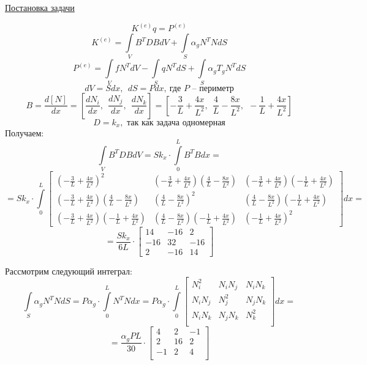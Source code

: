 \documentclass{bmstu}
\begin{document}
\begin{center}
\underline{Постановка задачи}
\end{center}
\[K^{(e)} q = P^{(e)}\]
\[K^{(e)} = \int \limits_V B^T D B dV + \int \limits_S \alpha_g N^T N dS\]
\[P^{(e)} = \int \limits_V f N^T dV - \int \limits_S q N^T dS + \int \limits_S \alpha_g T_g N^T dS\]
\[dV = Sdx,\ \ dS = Pdx,\ \text{где } P \text{ -- периметр}\]
\[B = \frac{d[N]}{dx} = \left[ \frac{dN_i}{dx},\ \  \frac{dN_j}{dx},\ \  \frac{dN_k}{dx}\right] = \left[ -\frac{3}{L} + \frac{4x}{L^2},\ \  \frac{4}{L} - \frac{8x}{L^2},\ \  -\frac{1}{L} + \frac{4x}{L^2}\right]\]
\[D = k_x, \text{ так как задача одномерная}\]
Получаем:
\[\int \limits_V B^T D B dV = S k_x \cdot \int \limits_0^L  B^T B dx =\]
\[= Sk_x \cdot \int \limits_0^L
\begin{bmatrix}
\left(-\frac{3}{L} + \frac{4x}{L^2} \right)^2 & \left(-\frac{3}{L} + \frac{4x}{L^2} \right)\left(\frac{4}{L} - \frac{8x}{L^2} \right) & \left(-\frac{3}{L} + \frac{4x}{L^2} \right)\left(-\frac{1}{L} + \frac{4x}{L^2} \right) \\
\left(-\frac{3}{L} + \frac{4x}{L^2} \right)\left(\frac{4}{L} - \frac{8x}{L^2} \right) & \left(\frac{4}{L} - \frac{8x}{L^2} \right)^2 & \left(\frac{4}{L} - \frac{8x}{L^2} \right)\left(-\frac{1}{L} + \frac{4x}{L^2} \right)\\
\left(-\frac{3}{L} + \frac{4x}{L^2} \right)\left(-\frac{1}{L} + \frac{4x}{L^2} \right)& \left(\frac{4}{L} - \frac{8x}{L^2} \right)\left(-\frac{1}{L} + \frac{4x}{L^2} \right) & \left(-\frac{1}{L} + \frac{4x}{L^2} \right)^2
\end{bmatrix} dx =\]
\[= \frac{Sk_x}{6L} \cdot 
\begin{bmatrix}
14 & -16 & 2\\
-16 & 32 & -16\\
2 & -16 & 14
\end{bmatrix}\]

Рассмотрим следующий интеграл:
\[\int \limits_S \alpha_g N^T N dS = P \alpha_g \cdot \int \limits_0^L N^T N dx = P \alpha_g
\cdot \int \limits_0^L \begin{bmatrix}
N_i^2 & N_iN_j & N_iN_k \\
N_iN_j & N_j^2 & N_jN_k \\
N_iN_k & N_jN_k & N_k^2 \\
\end{bmatrix} dx = \]
\[= \frac{\alpha_g P L}{30} \cdot \begin{bmatrix}
4 & 2 & -1 \\
2 & 16 & 2 \\
-1 & 2 & 4 \\
\end{bmatrix}\]
\end{document}
